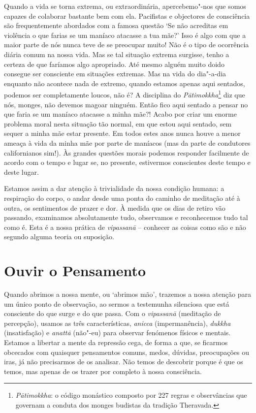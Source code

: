 Quando a vida se torna extrema, ou extraordinária, apercebemo"-nos que
somos capazes de colaborar bastante bem com ela. Pacifistas e objectores
de consciência são frequentemente abordados com a famosa questão `Se
não acreditas em violência o que farias se um maníaco atacasse a tua
mãe?' Isso é algo com que a maior parte de nós nunca teve de se
preocupar muito! Não é o tipo de ocorrência diária comum na nossa vida.
Mas se tal situação extrema surgisse, tenho a certeza de que faríamos
algo apropriado. Até mesmo alguém muito doido consegue ser consciente em
situações extremas. Mas na vida do dia"-a-dia enquanto não acontece nada
de extremo, quando estamos apenas aqui sentados, podemos ser
completamente loucos, não é? A disciplina do \emph{Pātimokkha}\footnote{%
  \emph{Pātimokkha}: o código monástico composto por 227 regras e observâncias
  que governam a conduta dos monges budistas da tradição Theravada.}
diz que nós, monges, não devemos magoar ninguém. Então fico aqui sentado a
pensar no que faria se um maníaco atacasse a minha mãe?! Acabo por criar
um enorme problema moral nesta
situação tão normal, em que estou aqui sentado, sem sequer a minha mãe
estar presente. Em todos estes anos nunca houve a menor ameaça à vida da
minha mãe por parte de maníacos (mas da parte de condutores
californianos sim!). Às grandes questões morais podemos responder
facilmente de acordo com o tempo e lugar se, no presente, estivermos
conscientes deste tempo e deste lugar.

Estamos assim a dar atenção à trivialidade da nossa condição humana: a
respiração do corpo, o andar desde uma ponta do caminho de meditação até
à outra, os sentimentos de prazer e dor. À medida que os dias de retiro
vão passando, examinamos absolutamente tudo, observamos e reconhecemos
tudo tal como é. Esta é a nossa prática de \emph{vipassanā} -- conhecer
as coisas como são e não segundo alguma teoria ou suposição.

\chapter{Ouvir o Pensamento}

Quando abrimos a nossa mente, ou `abrimos mão', trazemos a nossa atenção
para um único ponto de observação, ao sermos a testemunha silenciosa que
está consciente do que surge e do que passa. Com o \emph{vipassanā}
(meditação de percepção), usamos as três características, \emph{anicca}
(impermanência), \emph{dukkha} (insatisfação) e \emph{anattā} (não"-eu)
para observar fenómenos físicos e mentais. Estamos a libertar a mente da
repressão cega, de forma a que, se ficarmos obcecados com quaisquer
pensamentos comuns, medos, dúvidas, preocupações ou iras, já não
precisarmos de os analisar. Não temos de descobrir porque é que os
temos, mas apenas de os trazer por completo à nossa consciência.

